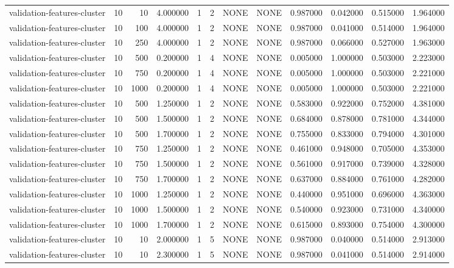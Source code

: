 \begin{tabular}{lrrrllllrrrr}
validation-features-cluster & 10 & 10 & 4.000000 & 1 & 2 & NONE & NONE & 0.987000 & 0.042000 & 0.515000 & 1.964000 \\
validation-features-cluster & 10 & 100 & 4.000000 & 1 & 2 & NONE & NONE & 0.987000 & 0.041000 & 0.514000 & 1.964000 \\
validation-features-cluster & 10 & 250 & 4.000000 & 1 & 2 & NONE & NONE & 0.987000 & 0.066000 & 0.527000 & 1.963000 \\
validation-features-cluster & 10 & 500 & 0.200000 & 1 & 4 & NONE & NONE & 0.005000 & 1.000000 & 0.503000 & 2.223000 \\
validation-features-cluster & 10 & 750 & 0.200000 & 1 & 4 & NONE & NONE & 0.005000 & 1.000000 & 0.503000 & 2.221000 \\
validation-features-cluster & 10 & 1000 & 0.200000 & 1 & 4 & NONE & NONE & 0.005000 & 1.000000 & 0.503000 & 2.221000 \\
validation-features-cluster & 10 & 500 & 1.250000 & 1 & 2 & NONE & NONE & 0.583000 & 0.922000 & 0.752000 & 4.381000 \\
validation-features-cluster & 10 & 500 & 1.500000 & 1 & 2 & NONE & NONE & 0.684000 & 0.878000 & 0.781000 & 4.344000 \\
validation-features-cluster & 10 & 500 & 1.700000 & 1 & 2 & NONE & NONE & 0.755000 & 0.833000 & 0.794000 & 4.301000 \\
validation-features-cluster & 10 & 750 & 1.250000 & 1 & 2 & NONE & NONE & 0.461000 & 0.948000 & 0.705000 & 4.353000 \\
validation-features-cluster & 10 & 750 & 1.500000 & 1 & 2 & NONE & NONE & 0.561000 & 0.917000 & 0.739000 & 4.328000 \\
validation-features-cluster & 10 & 750 & 1.700000 & 1 & 2 & NONE & NONE & 0.637000 & 0.884000 & 0.761000 & 4.282000 \\
validation-features-cluster & 10 & 1000 & 1.250000 & 1 & 2 & NONE & NONE & 0.440000 & 0.951000 & 0.696000 & 4.363000 \\
validation-features-cluster & 10 & 1000 & 1.500000 & 1 & 2 & NONE & NONE & 0.540000 & 0.923000 & 0.731000 & 4.340000 \\
validation-features-cluster & 10 & 1000 & 1.700000 & 1 & 2 & NONE & NONE & 0.615000 & 0.893000 & 0.754000 & 4.300000 \\
validation-features-cluster & 10 & 10 & 2.000000 & 1 & 5 & NONE & NONE & 0.987000 & 0.040000 & 0.514000 & 2.913000 \\
validation-features-cluster & 10 & 10 & 2.300000 & 1 & 5 & NONE & NONE & 0.987000 & 0.041000 & 0.514000 & 2.914000 \\

\end{tabular}
